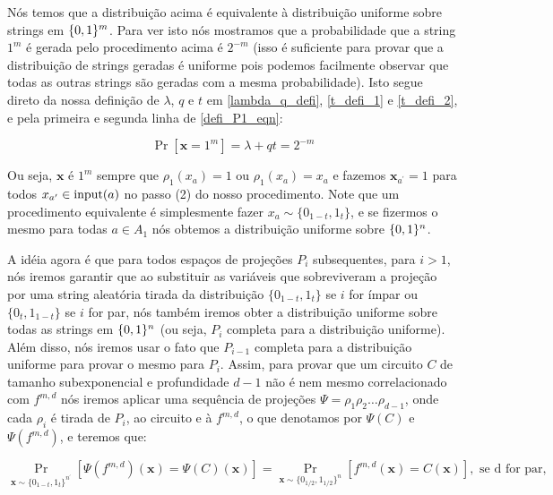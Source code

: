 Nós temos que a distribuição acima é equivalente à distribuição uniforme sobre strings em $\{0, 1\}^{m}$. Para ver isto nós mostramos que a probabilidade que a string $1^{m}$ é gerada pelo procedimento acima é $2^{-m}$ (isso é suficiente para provar que a distribuição de strings geradas é uniforme pois podemos facilmente observar que todas as outras strings são geradas com a mesma probabilidade). Isto segue direto da nossa definição de $\lambda$, $q$ e $t$ em \ref{lambda_q_defi}, \ref{t_defi_1} e \ref{t_defi_2}, e pela primeira e segunda linha de \ref{defi_P1_eqn}:

\begin{equation*}
	\Pr[\textbf{x} = 1^{m}]  = \lambda + qt = 2^{-m}
\end{equation*}

Ou seja, $\textbf{x}$ é $1^{m}$ sempre que $\rho_{1}(x_{a}) = 1$ ou $\rho_{1}(x_{a}) = x_{a}$ e fazemos $\textbf{x}_{a^{\prime}} = 1$ para todos $x_{a^{\prime}} \in \text{input}(a)$ no passo (2) do nosso procedimento. Note que um procedimento equivalente é simplesmente fazer $x_{a} \sim \{0_{1 - t}, 1_{t}\}$, e se fizermos o mesmo para todas $a \in A_{1}$ nós obtemos a distribuição uniforme sobre $\{0, 1\}^{n}$.

A idéia agora é que para todos espaços de projeções $P_{i}$ subsequentes, para $i > 1$, nós iremos garantir que ao substituir as variáveis que sobreviveram a projeção por uma string aleatória tirada da distribuição $\{0_{1 - t}, 1_{t}\}$ se $i$ for ímpar ou $\{0_{t}, 1_{1 - t}\}$ se $i$ for par, nós também iremos obter a distribuição uniforme sobre todas as strings em $\{0, 1\}^{n}$ (ou seja, $P_{i}$ completa para a distribuição uniforme). Além disso, nós iremos usar o fato que $P_{i - 1}$ completa para a distribuição uniforme para provar o mesmo para $P_{i}$. Assim, para provar que um circuito $C$ de tamanho subexponencial e profundidade $d - 1$ não é nem mesmo correlacionado com $f^{m, d}$ nós iremos aplicar uma sequência de projeções $\Psi = \rho_{1}\rho_{2}\dots\rho_{d - 1}$, onde cada $\rho_{i}$ é tirada de $P_{i}$, ao circuito e à $f^{m, d}$, o que denotamos por $\Psi(C)$ e $\Psi(f^{m, d})$, e teremos que:

\begin{equation} \label{uniform_comp_eq_1}
	\Pr_{\textbf{x} \sim \{0_{1 - t}, 1_{t}\}^{n^\prime}}[ \Psi(f^{m, d})(\textbf{x}) = \Psi(C)(\textbf{x})] = \Pr_{\textbf{x} \sim \{0_{1/2}, 1_{1/2}\}^{n}}[f^{m, d}(\textbf{x}) = C(\textbf{x})], \text{ se d for par},
\end{equation}


